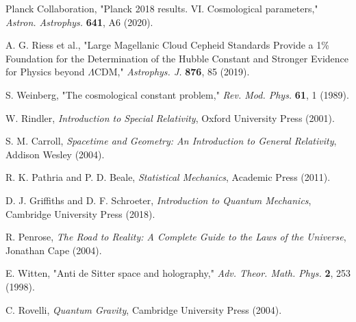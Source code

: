 \documentclass[12pt,a4paper]{article}
\begin{document}

\begin{thebibliography}{99}

Planck Collaboration, "Planck 2018 results. VI. Cosmological parameters," \textit{Astron. Astrophys.} \textbf{641}, A6 (2020).

A. G. Riess et al., "Large Magellanic Cloud Cepheid Standards Provide a 1\% Foundation for the Determination of the Hubble Constant and Stronger Evidence for Physics beyond $\Lambda$CDM," \textit{Astrophys. J.} \textbf{876}, 85 (2019).

S. Weinberg, "The cosmological constant problem," \textit{Rev. Mod. Phys.} \textbf{61}, 1 (1989).

W. Rindler, \textit{Introduction to Special Relativity}, Oxford University Press (2001).

S. M. Carroll, \textit{Spacetime and Geometry: An Introduction to General Relativity}, Addison Wesley (2004).

R. K. Pathria and P. D. Beale, \textit{Statistical Mechanics}, Academic Press (2011).

D. J. Griffiths and D. F. Schroeter, \textit{Introduction to Quantum Mechanics}, Cambridge University Press (2018).

R. Penrose, \textit{The Road to Reality: A Complete Guide to the Laws of the Universe}, Jonathan Cape (2004).

E. Witten, "Anti de Sitter space and holography," \textit{Adv. Theor. Math. Phys.} \textbf{2}, 253 (1998).

C. Rovelli, \textit{Quantum Gravity}, Cambridge University Press (2004).

\end{thebibliography}
\end{document}

